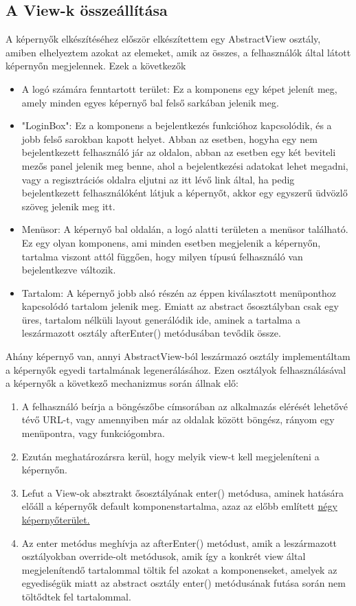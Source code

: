 \documentclass[centeredchapter]{thesis-ekf}
\theoremstyle{definition}
\theoremstyle{remark}
\begin{document}
\subsection{A View-k összeállítása}
A képernyők elkészítéséhez először elkészítettem egy AbstractView osztály, amiben elhelyeztem azokat az elemeket, amik az összes, a felhasználók által látott képernyőn megjelennek. Ezek a következők
\begin{itemize} \hypertarget{leiras-kepernyoteruletek}{}
	\item A logó számára fenntartott terület: Ez a komponens egy képet jelenít meg, amely minden egyes képernyő bal felső sarkában jelenik meg.
	\item "LoginBox": Ez a komponens a bejelentkezés funkcióhoz kapcsolódik, és a jobb felső sarokban kapott helyet. Abban az esetben, hogyha egy nem bejelentkezett felhasználó jár az oldalon, abban az esetben egy két beviteli mezős panel jelenik meg benne, ahol a bejelentkezési adatokat lehet megadni, vagy a regisztrációs oldalra eljutni az itt lévő link által, ha pedig bejelentkezett felhasználóként látjuk a képernyőt, akkor egy egyszerű üdvözlő szöveg jelenik meg itt.
	\item Menüsor: A képernyő bal oldalán, a logó alatti területen a menüsor található. Ez egy olyan komponens, ami minden esetben megjelenik a képernyőn, tartalma viszont attól függően, hogy milyen típusú felhasználó van bejelentkezve változik.
	\item Tartalom: A képernyő jobb alsó részén az éppen kiválasztott menüponthoz kapcsolódó tartalom jelenik meg. Emiatt az abstract ősosztályban csak egy üres, tartalom nélküli layout generálódik ide, aminek a tartalma a leszármazott osztály afterEnter() metódusában tevődik össze.
\end{itemize}


Ahány képernyő van, annyi AbstractView-ból leszármazó osztály implementáltam a képernyők egyedi tartalmának legenerálásához.
Ezen osztályok felhasználásával a képernyők a következő mechanizmus során állnak elő:
\begin{enumerate}
	\item A felhasználó beírja a böngészőbe címsorában az alkalmazás elérését lehetővé tévő URL-t, vagy amennyiben már az oldalak között böngész, rányom egy menüpontra, vagy funkciógombra.
	\item Ezután  meghatározársra kerül, hogy melyik view-t kell megjeleníteni a képernyőn.
	\item Lefut a View-ok absztrakt ősosztályának enter() metódusa, aminek hatására előáll a képernyők default komponenstartalma, azaz az előbb említett \hyperlink{leiras-kepernyoteruletek}{négy képernyőterület.}
	\item Az enter metódus meghívja az afterEnter() metódust, amik a leszármazott osztályokban override-olt metódusok, amik így a konkrét view által megjelenítendő tartalommal töltik fel azokat a komponenseket, amelyek az egyediségük miatt az abstract osztály enter() metódusának futása során nem töltődtek fel tartalommal.
\end{enumerate}
\end{document}
